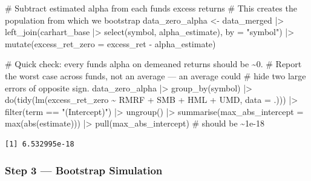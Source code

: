 \documentclass[
  letterpaper,
  DIV=11,
  numbers=noendperiod]{scrartcl}
\newenvironment{Shaded}{\begin{snugshade}}{\end{snugshade}}
\newcommand{\AttributeTok}[1]{\textcolor[rgb]{0.40,0.45,0.13}{#1}}
\newcommand{\CommentTok}[1]{\textcolor[rgb]{0.37,0.37,0.37}{#1}}
\newcommand{\FunctionTok}[1]{\textcolor[rgb]{0.28,0.35,0.67}{#1}}
\newcommand{\NormalTok}[1]{\textcolor[rgb]{0.00,0.23,0.31}{#1}}
\newcommand{\OtherTok}[1]{\textcolor[rgb]{0.00,0.23,0.31}{#1}}
\newcommand{\SpecialCharTok}[1]{\textcolor[rgb]{0.37,0.37,0.37}{#1}}
\newcommand{\StringTok}[1]{\textcolor[rgb]{0.13,0.47,0.30}{#1}}
\begin{document}
\begin{Shaded}
\begin{Highlighting}[]
\CommentTok{\# Subtract estimated alpha from each fund\textquotesingle{}s excess returns}
\CommentTok{\# This creates the population from which we bootstrap}
\NormalTok{data\_zero\_alpha }\OtherTok{\textless{}{-}}\NormalTok{ data\_merged }\SpecialCharTok{|\textgreater{}}
  \FunctionTok{left\_join}\NormalTok{(carhart\_base }\SpecialCharTok{|\textgreater{}} \FunctionTok{select}\NormalTok{(symbol, alpha\_estimate), }\AttributeTok{by =} \StringTok{"symbol"}\NormalTok{) }\SpecialCharTok{|\textgreater{}}
  \FunctionTok{mutate}\NormalTok{(}\AttributeTok{excess\_ret\_zero =}\NormalTok{ excess\_ret }\SpecialCharTok{{-}}\NormalTok{ alpha\_estimate)}

\CommentTok{\# Quick check: every fund\textquotesingle{}s alpha on demeaned returns should be \textasciitilde{}0.}
\CommentTok{\# Report the worst case across funds, not an average — an average could}
\CommentTok{\# hide two large errors of opposite sign.}
\NormalTok{data\_zero\_alpha }\SpecialCharTok{|\textgreater{}}
  \FunctionTok{group\_by}\NormalTok{(symbol) }\SpecialCharTok{|\textgreater{}}
  \FunctionTok{do}\NormalTok{(}\FunctionTok{tidy}\NormalTok{(}\FunctionTok{lm}\NormalTok{(excess\_ret\_zero }\SpecialCharTok{\textasciitilde{}}\NormalTok{ RMRF }\SpecialCharTok{+}\NormalTok{ SMB }\SpecialCharTok{+}\NormalTok{ HML }\SpecialCharTok{+}\NormalTok{ UMD, }\AttributeTok{data =}\NormalTok{ .))) }\SpecialCharTok{|\textgreater{}}
  \FunctionTok{filter}\NormalTok{(term }\SpecialCharTok{==} \StringTok{"(Intercept)"}\NormalTok{) }\SpecialCharTok{|\textgreater{}}
  \FunctionTok{ungroup}\NormalTok{() }\SpecialCharTok{|\textgreater{}}
  \FunctionTok{summarise}\NormalTok{(}\AttributeTok{max\_abs\_intercept =} \FunctionTok{max}\NormalTok{(}\FunctionTok{abs}\NormalTok{(estimate))) }\SpecialCharTok{|\textgreater{}}
  \FunctionTok{pull}\NormalTok{(max\_abs\_intercept)   }\CommentTok{\# should be \textasciitilde{}1e{-}18}
\end{Highlighting}
\end{Shaded}

\begin{verbatim}
[1] 6.532995e-18
\end{verbatim}

\subsubsection{Step 3 --- Bootstrap
Simulation}\label{step-3-bootstrap-simulation}
\end{document}
